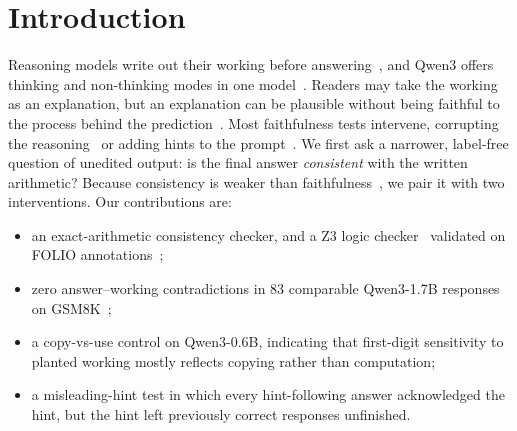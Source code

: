 \section{Introduction}\label{sec:intro}
Reasoning models write out their working before answering~\cite{wei2022}, and Qwen3
offers thinking and non-thinking modes in one model~\cite{qwen3}. Readers may take the
working as an explanation, but an explanation can be plausible without being faithful
to the process behind the prediction~\cite{jacovi2020}. Most faithfulness tests
intervene, corrupting the reasoning~\cite{lanham2023} or adding hints to the
prompt~\cite{turpin2023,chen2025}. We first ask a narrower, label-free question of
unedited output: is the final answer \emph{consistent} with the written arithmetic?
Because consistency is weaker than faithfulness~\cite{parcalabescu2024}, we pair it
with two interventions. Our contributions are:
\begin{itemize}
\item an exact-arithmetic consistency checker, and a Z3 logic
  checker~\cite{demoura2008} validated on FOLIO annotations~\cite{han2024folio};
\item zero answer--working contradictions in 83 comparable Qwen3-1.7B responses on
  GSM8K~\cite{cobbe2021};
\item a copy-vs-use control on Qwen3-0.6B, indicating that first-digit sensitivity to
  planted working mostly reflects copying rather than computation;
\item a misleading-hint test in which every hint-following answer acknowledged the
  hint, but the hint left previously correct responses unfinished.
\end{itemize}
